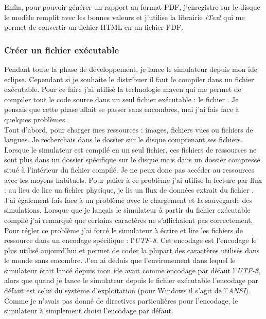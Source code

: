 Enfin, pour pouvoir générer un rapport au format PDF, j'enregistre sur le disque le modèle remplit avec les bonnes valeurs et j'utilise la librairie \emph{iText} qui me permet de convertir un fichier HTML en un fichier PDF.

\subsubsection{Créer un fichier exécutable}
Pendant toute la phase de développement, je lance le simulateur depuis mon \gls{ide} \gls{eclipse}. Cependant si je souhaite le distribuer il faut le compiler dans un fichier exécutable. Pour ce faire j'ai utilisé la technologie \gls{maven} qui me permet de compiler tout le code source dans un seul fichier exécutable : le fichier . Je pensais que cette phase allait se passer sans encombres, mai j'ai fais face à quelques problèmes.\\

Tout d'abord, pour charger mes ressources : images, fichiers vues ou fichiers de langues. Je recherchais dans le dossier sur le disque comprenant ses fichiers. Lorsque le simulateur est compilé en un seul fichier, ces fichiers de ressources ne sont plus dans un dossier spécifique sur le disque mais dans un dossier compressé situé à l'intérieur du fichier compilé. Je ne peux donc pas accéder au ressources avec les moyens habituels. Pour palier à ce problème j'ai utilisé la lecture par flux : au lieu de lire un fichier physique, je lis un flux de données extrait du fichier .\\

J'ai également fais face à un problème avec le chargement et la sauvegarde des simulations. Lorsque que je lançais le simulateur à partir du fichier exécutable compilé j'ai remarqué que certains caractères ne s'affichaient pas correctement. Pour régler ce problème j'ai forcé le simulateur à écrire et lire les fichiers de ressource dans un encodage spécifique : l'\emph{UTF-8}. Cet encodage est l'encodage le plus utilisé aujourd'hui et permet de coder la plupart des caractères utilisés dans le monde sans encombre. J'en ai déduis que l'environement dans lequel le simulateur était lancé depuis mon \gls{ide} avait comme encodage par défaut l'\emph{UTF-8}, alors que quand je lance le simulateur depuis le fichier exécutable l'encodage par défaut est celui du système d'exploitation (pour Windows il s'agit de l'\emph{ANSI}). Comme je n'avais pas donné de directives particulières pour l'encodage, le simulateur à simplement \og choisi \fg{} l'encodage par défaut.

